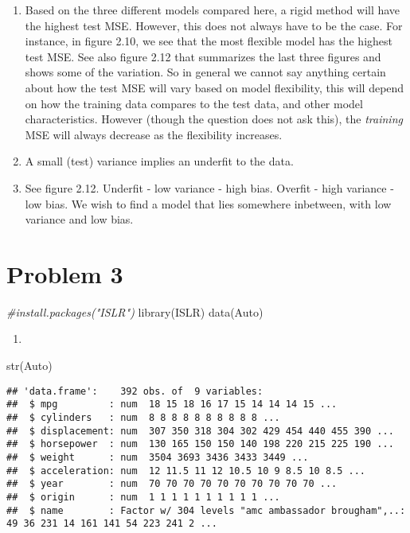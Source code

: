 \documentclass[
]{article}
\newenvironment{Shaded}{\begin{snugshade}}{\end{snugshade}}
\newcommand{\CommentTok}[1]{\textcolor[rgb]{0.56,0.35,0.01}{\textit{#1}}}
\newcommand{\FunctionTok}[1]{\textcolor[rgb]{0.00,0.00,0.00}{#1}}
\newcommand{\NormalTok}[1]{#1}
\providecommand{\tightlist}{%
  \setlength{\itemsep}{0pt}\setlength{\parskip}{0pt}}
\begin{document}
\begin{enumerate}
\def\labelenumi{\alph{enumi})}
\tightlist
\item
  Based on the three different models compared here, a rigid method will
  have the highest test MSE. However, this does not always have to be
  the case. For instance, in figure 2.10, we see that the most flexible
  model has the highest test MSE. See also figure 2.12 that summarizes
  the last three figures and shows some of the variation. So in general
  we cannot say anything certain about how the test MSE will vary based
  on model flexibility, this will depend on how the training data
  compares to the test data, and other model characteristics. However
  (though the question does not ask this), the \emph{training} MSE will
  always decrease as the flexibility increases.
\item
  A small (test) variance implies an underfit to the data.
\item
  See figure 2.12. Underfit - low variance - high bias. Overfit - high
  variance - low bias. We wish to find a model that lies somewhere
  inbetween, with low variance and low bias.
\end{enumerate}

\hypertarget{problem-3}{%
\section{Problem 3}\label{problem-3}}

\begin{Shaded}
\begin{Highlighting}[]
\CommentTok{\#install.packages("ISLR")}
\FunctionTok{library}\NormalTok{(ISLR)}
\FunctionTok{data}\NormalTok{(Auto)}
\end{Highlighting}
\end{Shaded}

\begin{enumerate}
\def\labelenumi{\alph{enumi})}
\tightlist
\item
\end{enumerate}

\begin{Shaded}
\begin{Highlighting}[]
\FunctionTok{str}\NormalTok{(Auto)}
\end{Highlighting}
\end{Shaded}

\begin{verbatim}
## 'data.frame':    392 obs. of  9 variables:
##  $ mpg         : num  18 15 18 16 17 15 14 14 14 15 ...
##  $ cylinders   : num  8 8 8 8 8 8 8 8 8 8 ...
##  $ displacement: num  307 350 318 304 302 429 454 440 455 390 ...
##  $ horsepower  : num  130 165 150 150 140 198 220 215 225 190 ...
##  $ weight      : num  3504 3693 3436 3433 3449 ...
##  $ acceleration: num  12 11.5 11 12 10.5 10 9 8.5 10 8.5 ...
##  $ year        : num  70 70 70 70 70 70 70 70 70 70 ...
##  $ origin      : num  1 1 1 1 1 1 1 1 1 1 ...
##  $ name        : Factor w/ 304 levels "amc ambassador brougham",..: 49 36 231 14 161 141 54 223 241 2 ...
\end{verbatim}
\end{document}
